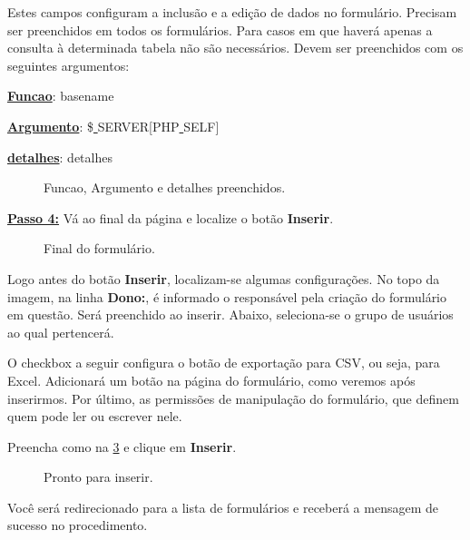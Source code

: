 \documentclass[9pt]{report}
\begin{document}
{      Estes campos configuram a inclusão e a edição de dados no
      formulário. Precisam ser preenchidos em todos os formulários.
      Para casos em que haverá apenas a consulta à determinada tabela
      não são necessários. Devem ser preenchidos com os seguintes
      argumentos:
  
      \underline{\textbf{Funcao}}: basename

      \underline{\textbf{Argumento}}: \$\underline{ }SERVER[PHP\underline{ }SELF]
      
      \underline{\textbf{detalhes}}: detalhes

      \begin{figure}[H]
        \caption{Funcao, Argumento e detalhes preenchidos.}
        \label{fig:configform2}
      \end{figure}

      \underline{\textbf{Passo 4:}} Vá ao final da página e
      localize o botão \textbf{Inserir}.

      \begin{figure}[H]
        \caption{Final do formulário.}
        \label{fig:finalform}
      \end{figure}

      Logo antes do botão \textbf{Inserir}, localizam-se algumas
      configurações. No topo da imagem, na linha \textbf{Dono:}, é
      informado o responsável pela criação do formulário em questão.
      Será preenchido ao inserir. Abaixo, seleciona-se o grupo de
      usuários ao qual pertencerá.

      O checkbox a seguir configura o botão de exportação para CSV,
      ou seja, para Excel. Adicionará um botão na página do
      formulário, como veremos após inserirmos. Por último, as
      permissões de manipulação do formulário, que definem quem  pode
      ler ou escrever nele.

      Preencha como na \figurename{ \ref{fig:finalform2}} e clique em
      \textbf{Inserir}.

      \begin{figure}[H]
        \caption{Pronto para inserir.}
        \label{fig:finalform2}
      \end{figure}

      Você será redirecionado para a lista de formulários e receberá
      a mensagem de sucesso no procedimento.
      
}
\end{document}

